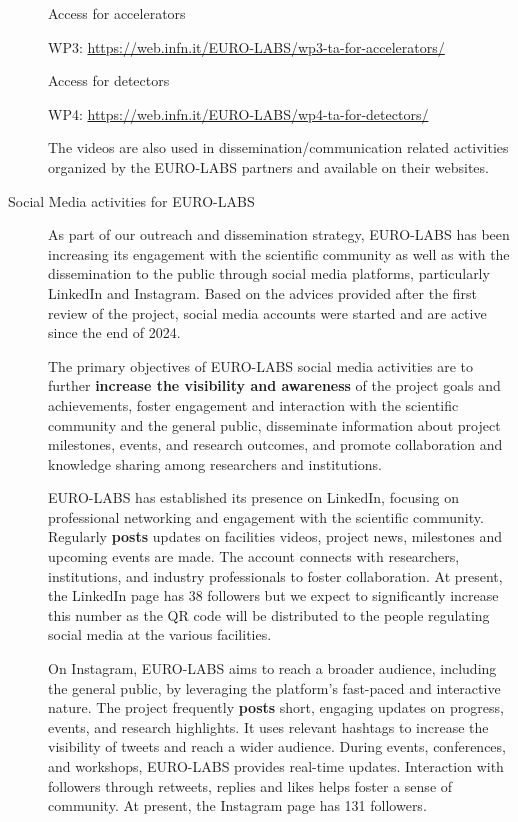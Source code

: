 \begin{description}
Access for accelerators

WP3: \url{https://web.infn.it/EURO-LABS/wp3-ta-for-accelerators/}

Access for detectors

WP4: \url{https://web.infn.it/EURO-LABS/wp4-ta-for-detectors/}

The videos are also used in dissemination/communication related activities organized by the  EURO-LABS partners and available on their websites.

\item[Social Media activities for EURO-LABS] As part of our outreach and dissemination strategy, EURO-LABS has been increasing its engagement with the scientific community as well as with the dissemination to the public through social media platforms, particularly LinkedIn and Instagram. Based on the advices provided after the first review of the project, social media accounts were started and are active since the end of 2024.

The primary objectives of EURO-LABS social media activities are to further \textbf{increase the visibility and awareness} of the project goals and achievements, foster engagement and interaction with the scientific community and the general public, disseminate information about project milestones, events, and research outcomes, and promote collaboration and knowledge sharing among researchers and institutions.
  

EURO-LABS has established its presence on LinkedIn, focusing on professional networking and engagement with the scientific community. Regularly \textbf{posts} updates on facilities videos, project news, milestones and upcoming events are made. The account connects with researchers, institutions, and industry professionals to foster collaboration. At present, the LinkedIn page has 38 followers but we expect to significantly increase this number as the QR code will be distributed to the people regulating social media at the various  facilities. 

On Instagram, EURO-LABS aims to reach a broader audience, including the general public, by leveraging the platform's fast-paced and interactive nature. The project frequently \textbf{posts} short, engaging updates on progress, events, and research highlights. It uses relevant hashtags to increase the visibility of tweets and reach a wider audience. During events, conferences, and workshops, EURO-LABS provides real-time updates. Interaction with followers through retweets, replies and likes helps foster a sense of community. At present, the Instagram page has 131 followers. 


\end{description}
